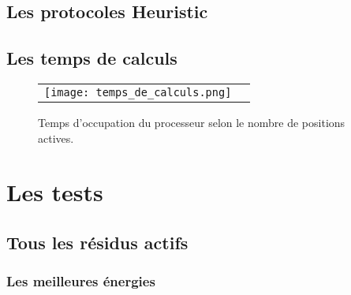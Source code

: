    \subsection{Les protocoles Heuristic} 
    

    \clearpage
    \subsection{Les temps de calculs} 
    
    \begin{figure}[h]
      \centering
      \begin{tabular}{cc}
        \texttt{[image: temps\_de\_calculs.png]} &
      \end{tabular}
      
      \caption{Temps d'occupation du processeur selon le nombre de positions actives.}
\label{graph:temps_CPU}
    \end{figure}
    
    
    \clearpage
    \section{Les tests} 
   \subsection{Tous les résidus actifs} 


   \subsubsection{Les meilleures énergies} 


